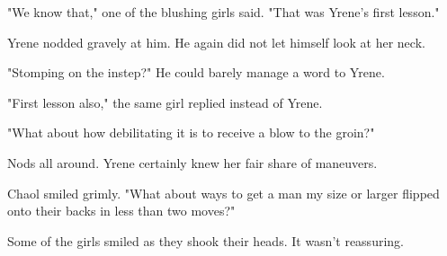 "We know that," one of the blushing girls said.
"That was Yrene's first lesson."

Yrene nodded gravely at him.
He again did not let himself look at her neck.

"Stomping on the instep?"
He could barely manage a word to Yrene.

"First lesson also," the same girl replied instead of Yrene.

"What about how debilitating it is to receive a blow to the groin?"

Nods all around.
Yrene certainly knew her fair share of maneuvers.

Chaol smiled grimly.
"What about ways to get a man my size or larger flipped onto their backs in less than two moves?"

Some of the girls smiled as they shook their heads.
It wasn't reassuring.

